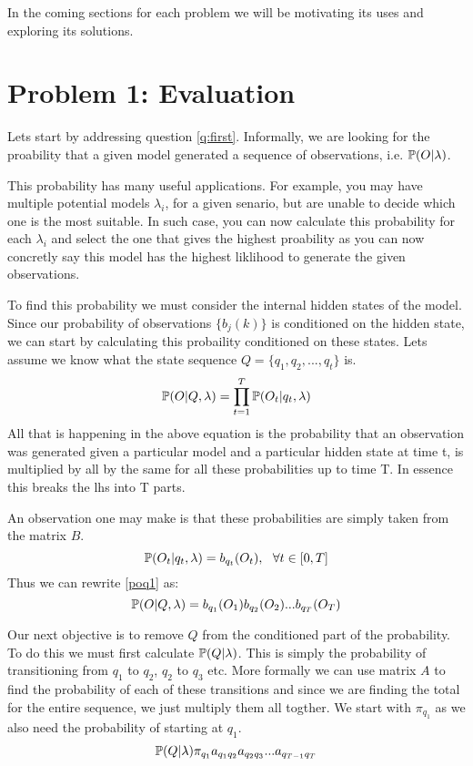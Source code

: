 In the coming sections for each problem we will be motivating its uses and exploring its solutions. 

\section{Problem 1: Evaluation}
Lets start by addressing question \ref{q:first}. Informally, we are looking for the proability that a given model generated a sequence of observations, i.e. $\mathbb{P} (O | \lambda)$.

This probability has many useful applications. For example, you may have multiple potential models $\lambda_i$, for a given senario, but are unable to decide which one is the most suitable. In such case, you can now calculate this probability for each $\lambda_i$ and select the one that gives the highest proability as you can now concretly say this model has the highest liklihood to generate the given observations.

To find this probability we must consider the internal hidden states of the model. Since our probability of observations $\{b_j(k)\}$ is conditioned on the hidden state, we can start by calculating this probaility conditioned on these states. Lets assume we know what the state sequence $Q = \{q_1,q_2,...,q_t\}$ is. 
\begin{equation}
    \label{poq1}
    \mathbb{P} (O | Q, \lambda) = \prod_{t=1}^T \mathbb{P} (O_t | q_t, \lambda)
\end{equation}
All that is happening in the above equation is the probability that an observation was generated given a particular model and a particular hidden state at time t, is multiplied by all by the same for all these probabilities up to time T. In essence this breaks the lhs into T parts.

An observation one may make is that these probabilities are simply taken from the matrix $B$. 
\[
    \mathbb{P} (O_t | q_t, \lambda) = b_{q_t}(O_t), \ \ \forall t \in [0,T] 
\]
Thus we can rewrite \ref{poq1} as:
\begin{equation}
    \label{oqlam}
    \mathbb{P} (O | Q, \lambda) = b_{q_1}(O_1) b_{q_2}(O_2)  ...  b_{q_T}(O_T)
\end{equation}

Our next objective is to remove $Q$ from the conditioned part of the probability. To do this we must first calculate $\mathbb{P} (Q | \lambda)$. This is simply the probability of transitioning from $q_1$ to $q_2$, $q_2$ to $q_3$ etc. More formally we can use matrix $A$ to find the probability of each of these transitions and since we are finding the total for the entire sequence, we just multiply them all togther. We start with $\pi_{q_1}$ as we also need the probability of starting at $q_1$.
\begin{equation}
    \label{qlam}
    \mathbb{P} ( Q | \lambda) \pi_{q_1} a_{q_1q_2} a_{q_2q_3} ... a_{q_{T-1}q_T}
\end{equation}

